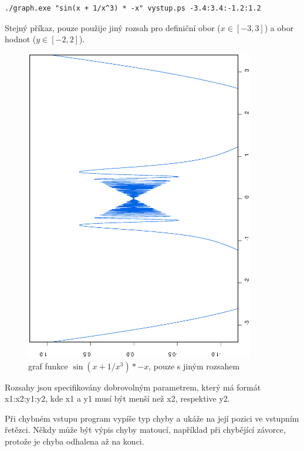 \documentclass[11pt]{article}
\begin{document}
\begin{verbatim}
./graph.exe "sin(x + 1/x^3) * -x" vystup.ps -3.4:3.4:-1.2:1.2
\end{verbatim}
Stejný příkaz, pouze použije jiný rozsah pro definiční obor ($x \in [-3, 3]$) a
obor hodnot ($y \in [-2, 2]$).
\begin{figure}[ht!]
\centering
	\includegraphics[width=10cm,angle=270]{figures/vystup2.eps}
	\caption{graf funkce $\sin \left(x + 1/x^3 \right) * -x$, pouze s jiným rozsahem}
\end{figure}


Rozsahy jsou specifikovány dobrovolným parametrem, který má formát
x1:x2:y1:y2, kde x1 a y1 musí být menší než x2, respektive y2. 

Při chybném vstupu program vypíše typ chyby a ukáže na její pozici ve vstupním
řetězci. Někdy může být výpis chyby matoucí, například při chybějící závorce,
protože je chyba odhalena až na konci.

\clearpage
\end{document}
